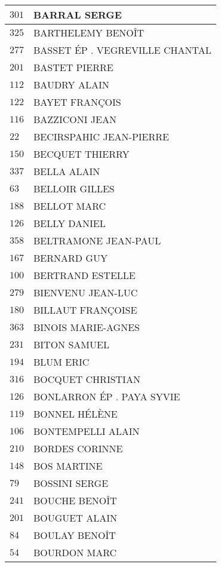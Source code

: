 \begin{xltabular}{\linewidth}{|l|X|}
    \hline
    $301$ & BARRAL SERGE \\
    \hline
    $325$ & BARTHELEMY BENOÎT \\
    \hline
    $277$ & BASSET ÉP . VEGREVILLE CHANTAL \\
    \hline
    $201$ & BASTET PIERRE \\
    \hline
    $112$ & BAUDRY ALAIN \\
    \hline
    $122$ & BAYET FRANÇOIS \\
    \hline
    $116$ & BAZZICONI JEAN \\
    \hline
    $22$ & BECIRSPAHIC JEAN-PIERRE \\
    \hline
    $150$ & BECQUET THIERRY \\
    \hline
    $337$ & BELLA ALAIN \\
    \hline
    $63$ & BELLOIR GILLES \\
    \hline
    $188$ & BELLOT MARC \\
    \hline
    $126$ & BELLY DANIEL \\
    \hline
    $358$ & BELTRAMONE JEAN-PAUL \\
    \hline
    $167$ & BERNARD GUY \\
    \hline
    $100$ & BERTRAND ESTELLE \\
    \hline
    $279$ & BIENVENU JEAN-LUC \\
    \hline
    $180$ & BILLAUT FRANÇOISE \\
    \hline
    $363$ & BINOIS MARIE-AGNES \\
    \hline
    $231$ & BITON SAMUEL \\
    \hline
    $194$ & BLUM ERIC \\
    \hline
    $316$ & BOCQUET CHRISTIAN \\
    \hline
    $126$ & BONLARRON ÉP . PAYA SYVIE \\
    \hline
    $119$ & BONNEL HÉLÈNE \\
    \hline
    $106$ & BONTEMPELLI ALAIN \\
    \hline
    $210$ & BORDES CORINNE \\
    \hline
    $148$ & BOS MARTINE \\
    \hline
    $79$ & BOSSINI SERGE \\
    \hline
    $241$ & BOUCHE BENOÎT \\
    \hline
    $201$ & BOUGUET ALAIN \\
    \hline
    $84$ & BOULAY BENOÎT \\
    \hline
    $54$ & BOURDON MARC \\

\end{xltabular}

